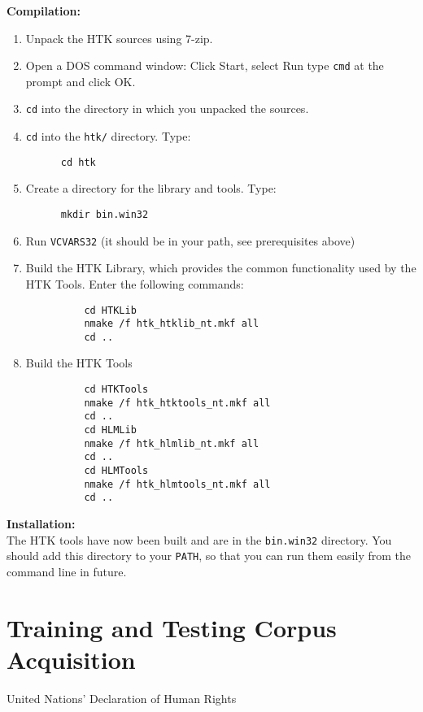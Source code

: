 \documentclass{wileySev}
\begin{document}
\textbf{Compilation:}
\begin{enumerate}
\item Unpack the HTK sources using 7-zip.
\item Open a DOS command window: Click Start, select Run type \texttt{cmd} at the prompt and click OK.
\item \texttt{cd} into the directory in which you unpacked the sources.
\item \texttt{cd} into the \texttt{htk/} directory. Type:
\begin{verbatim}
      cd htk
\end{verbatim}
\item Create a directory for the library and tools. Type:

\begin{verbatim}
      mkdir bin.win32
\end{verbatim}
\item Run \texttt{VCVARS32} (it should be in your path, see prerequisites above)
\item Build the HTK Library, which provides the common functionality
      used by the HTK Tools. Enter the following commands:

\begin{verbatim}
          cd HTKLib
          nmake /f htk_htklib_nt.mkf all
          cd ..
\end{verbatim}

\item Build the HTK Tools
\begin{verbatim}
          cd HTKTools
          nmake /f htk_htktools_nt.mkf all
          cd ..
          cd HLMLib
          nmake /f htk_hlmlib_nt.mkf all
          cd ..
          cd HLMTools
          nmake /f htk_hlmtools_nt.mkf all
          cd ..
\end{verbatim}
\end{enumerate}

\textbf{Installation:}\\
The HTK tools have now been built and are in the \texttt{bin.win32}
directory. You should add this directory to your \texttt{PATH}, so that you can
run them easily from the command line in future.

\chapter{Training and Testing Corpus Acquisition}
{United Nations' Declaration of Human Rights \cite{UNDHR}}
\end{document}
